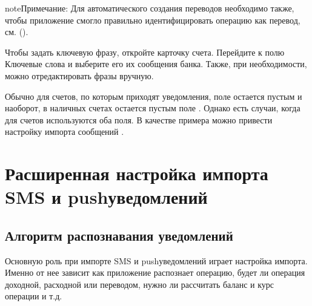 \documentclass[a4paper,10pt,russian]{sphinxmanual}
\begin{document}
\begin{sphinxadmonition}{note}{Примечание:}
\sphinxAtStartPar
Для автоматического создания переводов необходимо также, чтобы приложение смогло правильно идентифицировать операцию как перевод, см. {\hyperref[\detokenize{notifications:chapter-notifications}]{}} ().
\end{sphinxadmonition}

\sphinxAtStartPar
Чтобы задать ключевую фразу, откройте карточку счета. Перейдите к полю Ключевые слова и выберите его их сообщения банка. Также, при необходимости, можно отредактировать фразы вручную.

\noindent{}

\noindent{}

\noindent{}

\sphinxAtStartPar
Обычно для счетов, по которым приходят уведомления, поле  остается пустым и наоборот, в наличных счетах
остается пустым поле . Однако есть случаи, когда для счетов используются оба поля. В качестве примера можно привести настройку
импорта сообщений .

\sphinxstepscope


\chapter{Расширенная настройка импорта SMS и push\sphinxhyphen{}уведомлений}
\label{\detokenize{notifications:sms-push}}\label{\detokenize{notifications:chapter-notifications}}\label{\detokenize{notifications::doc}}

\section{Алгоритм распознавания уведомлений}
\label{\detokenize{notifications:id1}}
\sphinxAtStartPar
Основную роль при импорте SMS и push\sphinxhyphen{}уведомлений играет настройка импорта. Именно от нее зависит
как приложение распознает операцию, будет ли операция доходной, расходной или переводом, нужно ли
рассчитать баланс и курс операции и т.д.
\end{document}

